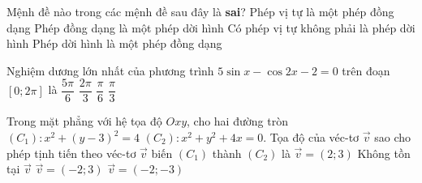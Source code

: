 \begin{ex}%
Mệnh đề nào trong các mệnh đề sau đây là \textbf{sai}?
\choice
{Phép vị tự là một phép đồng dạng}
{\True Phép đồng dạng là một phép dời hình}
{Có phép vị tự không phải là phép dời hình}
{Phép dời hình là một phép đồng dạng}
\end{ex}
\begin{ex}%
Nghiệm dương lớn nhất của phương trình $5\sin x-\cos 2x-2=0$ trên đoạn $[ 0;2\pi]$ là
\choice
	{\True $\dfrac{5\pi}{6}$}
	{$\dfrac{2\pi}{3}$}
	{$\dfrac{\pi}{6}$}
	{$\dfrac{\pi}{3}$}
\end{ex}
\begin{ex}%
Trong mặt phẳng với hệ tọa độ $ Oxy$, cho hai đường tròn $(C_1):x^2+(y-3)^2=4$ $(C_2):x^2+y^2+4x=0$. Tọa độ của véc-tơ $\overrightarrow{v}$ sao cho phép tịnh tiến theo véc-tơ $\overrightarrow{v}$ biến $(C_1)$ thành $(C_2)$ là
\choice
	{$\overrightarrow{v}=(2;3)$}
	{Không tồn tại $\overrightarrow{v}$}
	{$\overrightarrow{v}=(-2;3)$}
	{\True $\overrightarrow{v}=(-2;-3)$}
\end{ex}
